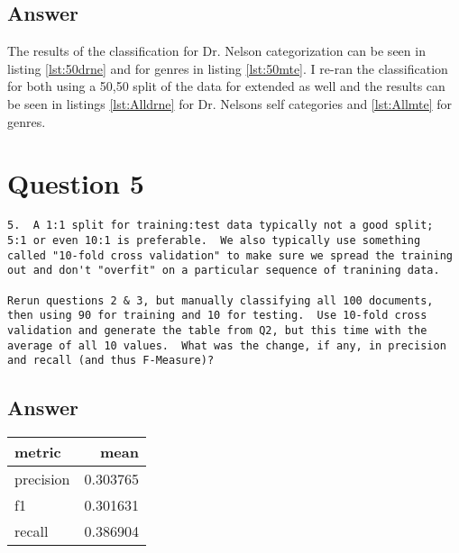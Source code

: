 \documentclass[letterpaper,10pt]{article}
\begin{document}
\subsection*{Answer}
The results of the classification for Dr. Nelson categorization can be seen in listing
\hyperref[lst:50drne]{\ref{lst:50drne}} and for genres in listing \hyperref[lst:50mte]{\ref{lst:50mte}}.
I re-ran the classification for both using a 50,50 split of the data for extended as well and the results can be seen in listings \hyperref[lst:Alldrne]{\ref{lst:Alldrne}} for Dr. Nelsons self categories and \hyperref[lst:Allmte]{\ref{lst:Allmte}} for genres.



  



 
\newpage
\section*{Question 5}
\begin{verbatim}
5.  A 1:1 split for training:test data typically not a good split;
5:1 or even 10:1 is preferable.  We also typically use something
called "10-fold cross validation" to make sure we spread the training
out and don't "overfit" on a particular sequence of tranining data.

Rerun questions 2 & 3, but manually classifying all 100 documents,
then using 90 for training and 10 for testing.  Use 10-fold cross
validation and generate the table from Q2, but this time with the
average of all 10 values.  What was the change, if any, in precision
and recall (and thus F-Measure)?
\end{verbatim}
\subsection*{Answer}
\begin{tabular}{lr}
\hline
 metric    &     mean \\
\hline
 precision & 0.303765 \\
 f1        & 0.301631 \\
 recall    & 0.386904 \\
\hline
\end{tabular}
\end{document}

